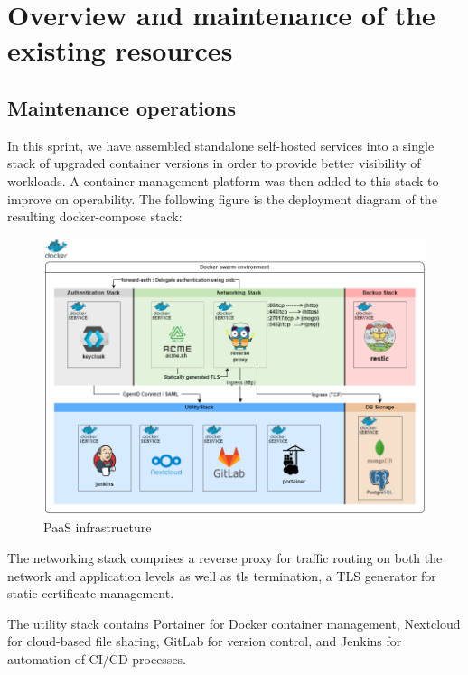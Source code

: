 \section{Overview and maintenance of the existing resources}
\subsection{Maintenance operations}

\hspace{7mm}In this sprint, we have assembled standalone self-hosted services into a single stack of upgraded container versions in order to provide better visibility of workloads. A container management platform was then added to this stack to improve on operability. 
The following figure is the deployment diagram of the resulting docker-compose stack:

 \begin{figure}[H] 
\includegraphics[width=1.0\textwidth,angle=00]{assets/f99.png}
\caption{PaaS infrastructure}
\label{fig:f9}
\end{figure}

\hspace{7mm}The networking stack comprises a reverse proxy for traffic routing on both the network and application levels as well as tls termination, a TLS generator for static certificate management.

\hspace{7mm}The utility stack contains Portainer for Docker container management, Nextcloud for cloud-based file sharing, GitLab for version control, and Jenkins for automation of CI/CD processes.

